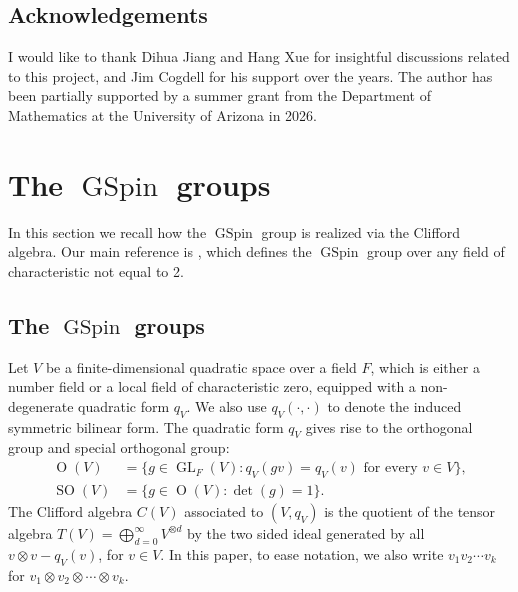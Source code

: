 \documentclass[12pt]{amsart}
\theoremstyle{remark}
\DeclareMathOperator{\GL}{GL}
\DeclareMathOperator{\SO}{SO}
\DeclareMathOperator{\GSpin}{GSpin}
\DeclareMathOperator{\Orth}{O}
\begin{document}
\subsection*{Acknowledgements}
I would like to thank Dihua Jiang and Hang Xue for insightful discussions related to this project, and Jim Cogdell for his support over the years.  
The author has been partially supported by a summer grant from the Department of Mathematics at the University of Arizona in 2026.







\section{The $\GSpin$ groups}
\label{section-GSpin-groups}
In this section we recall how the $\GSpin$ group is realized via the Clifford algebra. Our main reference is \cite{Shimura2004}, which defines the $\GSpin$ group over any field of characteristic not equal to 2. 
\subsection{The $\GSpin$ groups}
\label{subsection-GSpin-groups}

Let $V$ be a finite-dimensional quadratic space over a field $F$, which is either a number field or a local field of characteristic zero, equipped with a non-degenerate quadratic form $q_V$. We also use $q_V(\cdot, \cdot)$ to denote the induced symmetric bilinear form. The quadratic form $q_V$  gives rise to the orthogonal group and special orthogonal group:
\begin{equation*}
\begin{split}
\Orth(V) &=\{g\in \GL_F(V): q_V(gv)=q_V(v) \text{ for every $v\in V$}\}, \\
\SO(V) &=\{g\in \Orth(V):\det(g)=1\}.
\end{split}
\end{equation*}
The Clifford algebra $C(V)$ associated to $(V, q_V)$ is the quotient of the tensor algebra $T(V)=\bigoplus_{d=0}^{\infty} V^{\otimes d}$
by the two sided ideal generated by all $v\otimes v - q_V(v)$, for $v\in V$. In this paper, to ease notation, we also write $v_1v_2\cdots v_k$ for $v_1\otimes v_2\otimes \cdots \otimes v_k$. 
\end{document}
